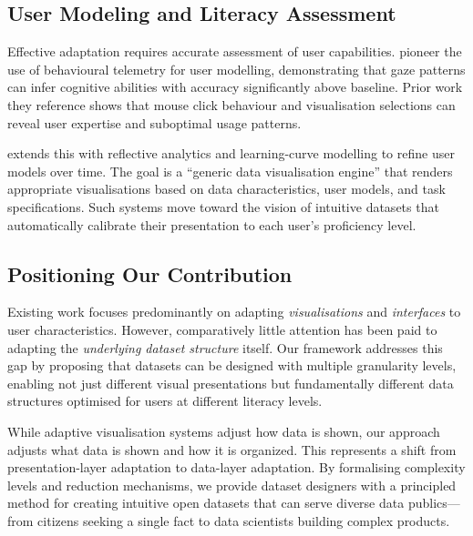 \documentclass[12pt,a4paper]{article}
\begin{document}
\subsection{User Modeling and Literacy Assessment}

\noindent Effective adaptation requires accurate assessment of user capabilities. \citet{steichen2013useradaptiveinformationvisualisation} pioneer the use of behavioural telemetry for user modelling, demonstrating that gaze patterns can infer cognitive abilities with accuracy significantly above baseline. Prior work they reference shows that mouse click behaviour and visualisation selections can reveal user expertise and suboptimal usage patterns.

\vspace{1em}

\noindent \citet{amyrotos2021adaptivevisualisationsfor} extends this with reflective analytics and learning-curve modelling to refine user models over time. The goal is a ``generic data visualisation engine'' that renders appropriate visualisations based on data characteristics, user models, and task specifications. Such systems move toward the vision of intuitive datasets that automatically calibrate their presentation to each user's proficiency level.

\subsection{Positioning Our Contribution}

\noindent Existing work focuses predominantly on adapting \textit{visualisations} and \textit{interfaces} to user characteristics. However, comparatively little attention has been paid to adapting the \textit{underlying dataset structure} itself. Our framework addresses this gap by proposing that datasets can be designed with multiple granularity levels, enabling not just different visual presentations but fundamentally different data structures optimised for users at different literacy levels.

\vspace{1em}

\noindent While adaptive visualisation systems adjust how data is shown, our approach adjusts what data is shown and how it is organized. This represents a shift from presentation-layer adaptation to data-layer adaptation. By formalising complexity levels and reduction mechanisms, we provide dataset designers with a principled method for creating intuitive open datasets that can serve diverse data publics---from citizens seeking a single fact to data scientists building complex products.
\end{document}
